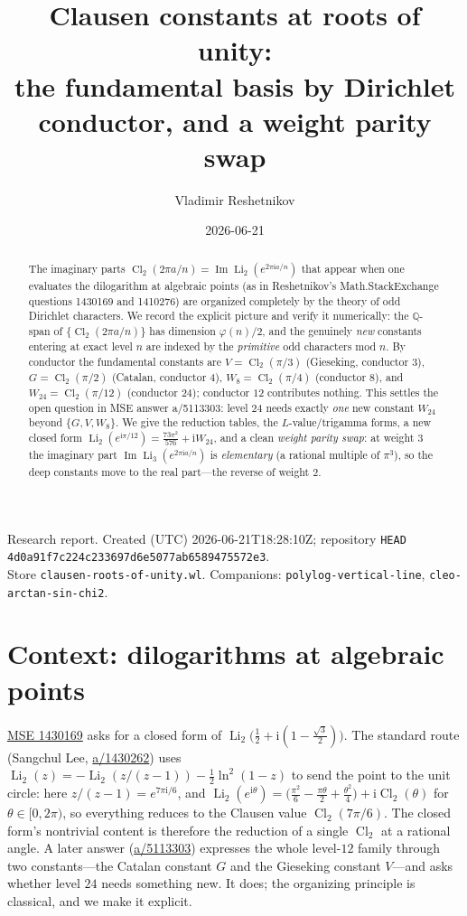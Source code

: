\documentclass[11pt]{article}
\title{Clausen constants at roots of unity:\\
the fundamental basis by Dirichlet conductor, and a weight parity swap}
\author{Vladimir Reshetnikov}
\date{2026-06-21}
\DeclareMathOperator{\Li}{Li}
\DeclareMathOperator{\Cl}{Cl}
\newcommand{\iu}{\mathrm{i}}
\newcommand{\Imag}{\operatorname{Im}}
\theoremstyle{plain}\newtheorem{theorem}{Theorem}\newtheorem{proposition}[theorem]{Proposition}
\theoremstyle{remark}\newtheorem{remark}[theorem]{Remark}
\begin{document}
\maketitle
\begin{center}\small
Research report. Created (UTC) 2026-06-21T18:28:10Z; repository \texttt{HEAD}
\texttt{4d0a91f7c224c233697d6e5077ab6589475572e3}.\\
Store \texttt{clausen-roots-of-unity.wl}. Companions: \texttt{polylog-vertical-line},
\texttt{cleo-arctan-sin-chi2}.
\end{center}

\begin{abstract}
The imaginary parts $\Cl_2(2\pi a/n)=\Imag\Li_2(e^{2\pi\iu a/n})$ that appear when one evaluates the
dilogarithm at algebraic points (as in Reshetnikov's Math.StackExchange questions 1430169 and 1410276)
are organized completely by the theory of odd Dirichlet characters. We record the explicit picture and
verify it numerically: the $\mathbb Q$-span of $\{\Cl_2(2\pi a/n)\}$ has dimension $\varphi(n)/2$, and the
genuinely \emph{new} constants entering at exact level $n$ are indexed by the \emph{primitive} odd
characters mod $n$. By conductor the fundamental constants are $V=\Cl_2(\pi/3)$ (Gieseking, conductor $3$),
$G=\Cl_2(\pi/2)$ (Catalan, conductor $4$), $W_8=\Cl_2(\pi/4)$ (conductor $8$), and $W_{24}=\Cl_2(\pi/12)$
(conductor $24$); conductor $12$ contributes nothing. This settles the open question in MSE answer
a/5113303: level $24$ needs exactly \emph{one} new constant $W_{24}$ beyond $\{G,V,W_8\}$. We give the
reduction tables, the $L$-value/trigamma forms, a new closed form
$\Li_2(e^{\iu\pi/12})=\tfrac{73\pi^2}{576}+\iu W_{24}$, and a clean \emph{weight parity swap}: at weight
$3$ the imaginary part $\Imag\Li_3(e^{2\pi\iu a/n})$ is \emph{elementary} (a rational multiple of $\pi^3$),
so the deep constants move to the real part---the reverse of weight $2$.
\end{abstract}

\section{Context: dilogarithms at algebraic points}
\href{https://math.stackexchange.com/q/1430169}{MSE 1430169} asks for a closed form of
$\Li_2\!\bigl(\tfrac12+\iu(1-\tfrac{\sqrt3}2)\bigr)$. The standard route (Sangchul Lee,
\href{https://math.stackexchange.com/a/1430262}{a/1430262}) uses $\Li_2(z)=-\Li_2(z/(z-1))-\tfrac12\ln^2(1-z)$
to send the point to the unit circle: here $z/(z-1)=e^{7\pi\iu/6}$, and
$\Li_2(e^{\iu\theta})=\bigl(\tfrac{\pi^2}6-\tfrac{\pi\theta}2+\tfrac{\theta^2}4\bigr)+\iu\Cl_2(\theta)$ for
$\theta\in[0,2\pi)$, so everything reduces to the Clausen value $\Cl_2(7\pi/6)$. The closed form's
nontrivial content is therefore the reduction of a single $\Cl_2$ at a rational angle. A later answer
(\href{https://math.stackexchange.com/a/5113303}{a/5113303}) expresses the whole level-$12$ family through
two constants---the Catalan constant $G$ and the Gieseking constant $V$---and asks whether level $24$
needs something new. It does; the organizing principle is classical, and we make it explicit.
\end{document}
